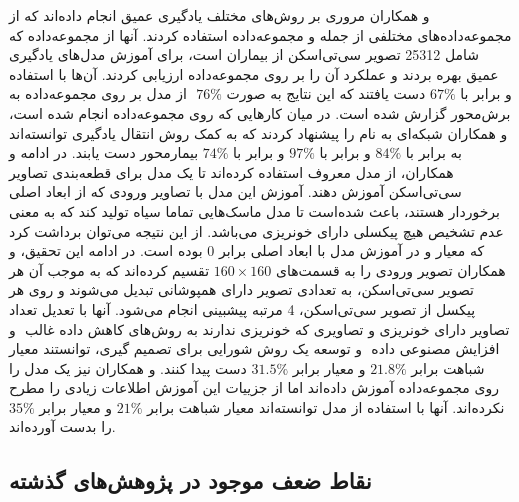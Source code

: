  \cite{neethi2022stroke} و همکاران 
 مروری بر روش‌های مختلف یادگیری عمیق انجام داده‌اند که از مجموعه‌داده‌های مختلفی از جمله  و مجموعه‌داده  استفاده کردند. آنها از مجموعه‌داده  که شامل 25312 تصویر سی‌تی‌اسکن از بیماران است، برای آموزش مدل‌های یادگیری عمیق بهره بردند و عملکرد آن را بر روی مجموعه‌داده  ارزیابی کردند. آن‌ها با استفاده از مدل  بر روی مجموعه‌داده  به
  ‎ \(76\%\) و 
   برابر با 
   \(67\%\) 
   دست یافتند که این نتایج به صورت برش‌محور
   گزارش شده است.
 در میان کارهایی که روی مجموعه‌داده  انجام شده است،
  \cite{kyung2022improved}
و همکاران
شبکه‌ای به نام 
را پیشنهاد کردند که به کمک روش انتقال یادگیری
توانسته‌اند به  برابر با
 \(84\%\)
 و 
 برابر با 
  \(97\%\)
  و 
  برابر با
  \(74\%\)
  بیمارمحور 
   دست یابند.
 در ادامه 
 \cite{physionet_hssayeni2020intracranial}
 و همکاران، از مدل معروف 
 استفاده کرده‌اند تا یک مدل برای قطعه‌بندی تصاویر سی‌تی‌اسکن آموزش دهند. آموزش این مدل با تصاویر ورودی که از ابعاد اصلی برخوردار هستند، باعث شده‌است تا مدل ماسک‌هایی
 تماما سیاه تولید کند که به معنی عدم تشخیص هیچ پیکسلی دارای خونریزی می‌باشد. از این نتیجه می‌توان برداشت کرد که معیار 
 و 
 در آموزش مدل با ابعاد اصلی برابر 0 بوده است. در ادامه این تحقیق، 
  و همکاران تصویر ورودی را به قسمت‌های 
  $160\times160$
  تقسیم کرده‌اند که به موجب آن هر تصویر سی‌تی‌اسکن، به تعدادی تصویر دارای همپوشانی تبدیل می‌شوند و روی هر پیکسل از تصویر سی‌تی‌اسکن، 4 مرتبه پیشبینی انجام می‌شود. آنها با تعدیل تعداد تصاویر دارای خونریزی و تصاویری که خونریزی ندارند به روش‌های کاهش داده غالب
  ‌
   و افزایش مصنوعی داده
   ‌
   و توسعه یک روش شورایی برای تصمیم گیری، توانستند معیار شباهت 
   برابر 
   $21.8\%$
    و معیار 
    برابر 
    $31.5\%$
    دست پیدا کنند.
    \cite{li2020deep}
    و همکاران نیز یک مدل 
    را روی مجموعه‌داده
    آموزش داده‌اند اما از جزییات این آموزش اطلاعات زیادی را مطرح نکرده‌اند. آنها با استفاده از مدل
    توانسته‌اند معیار شباهت 
    برابر 
    $21\%$
    و معیار
    برابر 
    $35\%$
    را بدست آورده‌اند.
 \subsection{نقاط ضعف موجود در پژوهش‌های گذشته}
 
